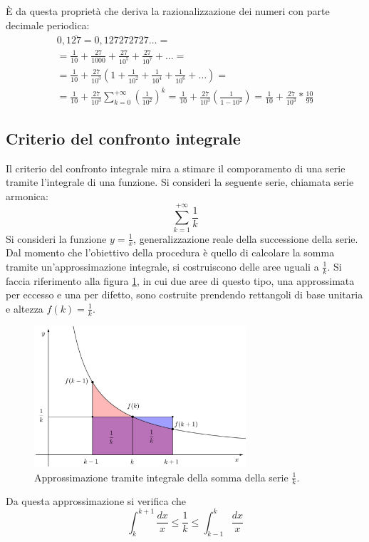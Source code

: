È da questa proprietà che deriva la razionalizzazione dei numeri con parte decimale periodica:
\begin{gather*}
	0,1\overline{27}=0,127272727\dots=\\
	=\frac{1}{10}+\frac{27}{1000}+\frac{27}{10^5}+\frac{27}{10^7}+\dots=\\
	=\frac{1}{10}+\frac{27}{10^3}\left(1+\frac{1}{10^2}+\frac{1}{10^4}+\frac{1}{10^6}+\dots\right)=\\
	=\frac{1}{10}+\frac{27}{10^3}\sum_{k=0}^{+\infty}\left(\frac{1}{10^2}\right)^k=\frac{1}{10}+\frac{27}{10^3}\left(\frac{1}{1-10^2}\right)=\frac{1}{10}+\frac{27}{10^3}*\frac{10}{99}
\end{gather*}


\subsection{Criterio del confronto integrale}
Il criterio del confronto integrale mira a stimare il comporamento di una serie tramite l'integrale di una funzione. Si consideri la seguente serie, chiamata serie armonica:
\[
	\sum_{k=1}^{+\infty}\frac{1}{k}
\]
Si consideri la funzione $y=\frac{1}{x}$, generalizzazione reale della successione della serie. Dal momento che l'obiettivo della procedura è quello di calcolare la somma tramite un'approssimazione integrale, si costruiscono delle aree uguali a $\frac{1}{k}$. Si faccia riferimento alla figura \ref{fig:intk}, in cui due aree di questo tipo, una approssimata per eccesso e una per difetto, sono costruite prendendo rettangoli di base unitaria e altezza $f(k)=\frac{1}{k}$.
\begin{figure}[ht]
	\centering
	\includegraphics[width=0.7\textwidth]{grafici/intk}
	\caption{Approssimazione tramite integrale della somma della serie $\frac{1}{k}$.}
	\label{fig:intk}
\end{figure}
Da questa approssimazione si verifica che
\[
	\int_k^{k+1} \frac{dx}{x}\leq \frac{1}{k}\leq \int_{k-1}^k \frac{dx}{x}
\]
